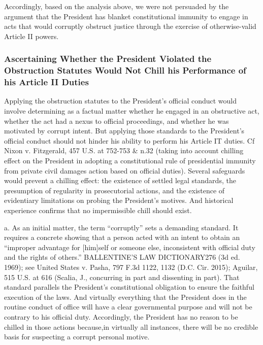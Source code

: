 Accordingly, based on the analysis above, we were not persuaded by the argument that the President has blanket constitutional immunity to engage in acts that would corruptly obstruct justice through the exercise of otherwise-valid Article II powers.%

\subsubsection{Ascertaining Whether the President Violated the Obstruction Statutes Would Not Chill his Performance of his Article II Duties}

Applying the obstruction statutes to the President’s official conduct would involve determining as a factual matter whether he engaged in an obstructive act, whether the act had a nexus to official proceedings, and whether he was motivated by corrupt intent.
But applying those standards to the President’s official conduct should not hinder his ability to perform his Article IT duties.
Cf Nixon v. Fitzgerald, 457 U.S. at 752-753 & n.32 (taking into account chilling effect on the President in adopting a constitutional rule of presidential immunity from private civil damages action based on official duties).
Several safeguards would prevent a chilling effect: the existence of settled legal standards, the presumption of regularity in prosecutorial actions, and the existence of evidentiary limitations on probing the President’s motives.
And historical experience confirms that no impermissible chill should exist.

a. As an initial matter, the term “corruptly” sets a demanding standard.
It requires a concrete showing that a person acted with an intent to obtain an “improper advantage for [him]self or someone else, inconsistent with official duty and the rights of others.” BALLENTINE’S LAW DICTIONARY276 (3d ed. 1969);
see United States v. Pasha, 797 F.3d 1122, 1132 (D.C. Cir. 2015); Aguilar, 515 U.S. at 616 (Scalia, J., concurring in part and dissenting in part).
That standard parallels the President’s constitutional obligation to ensure the faithful execution of the laws.
And virtually everything that the President does in the routine conduct of office will have a clear governmental purpose and will not be contrary to his official duty.
Accordingly, the President has no reason to be chilled in those actions because,in virtually all instances, there will be no credible basis for suspecting a corrupt personal motive.

